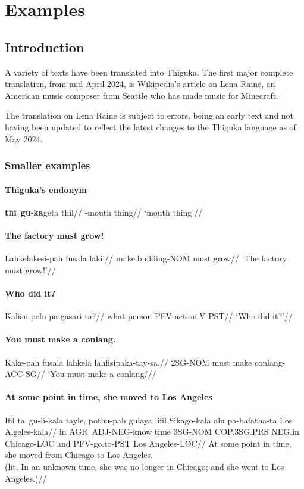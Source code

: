 
\part{Examples}
\chapter{Introduction}
A variety of texts have been translated into Thiguka. The first major complete translation, from mid-April 2024, is Wikipedia's article on Lena Raine, an American music composer from Seattle who has made music for Minecraft.

The translation on Lena Raine is subject to errors, being an early text and not having been updated to reflect the latest changes to the Thiguka language as of May 2024.

\section{Smaller examples}
\subsection{Thiguka's endonym}
\ex
\begingl
    \gla \textbf{thi}~\textbf{gu}-\textbf{ka}geta thil//
    \glb \agradj{}-mouth thing//
    \glft `mouth thing'//
\endgl
\xe

\subsection{The factory must grow!}
\ex
\begingl
    \gla Lahkelakesi-pah fusala laki!//
    \glb make.building-NOM must grow//
    \glft `The factory must grow!'//
\endgl
\xe

\subsection{Who did it?}
\ex
\begingl
    \gla Kalisu pelu pa-gasari-ta?//
    \glb what person PFV-action.V-PST//
    \glft `Who did it?'//
\endgl
\xe

\subsection{You must make a conlang.}
\ex
\begingl
    \gla Kake-pah fusala lahkela lahfisipaka-tay-sa.//
    \glb 2SG-NOM must make conlang-ACC-SG//
    \glft `You must make a conlang.'//
\endgl
\xe

\subsection{At some point in time, she moved to Los Angeles}
\ex
\begingl
    \gla Ifil ta~gu-li-kala    tayle, pothu-pah gulaya      lifil  Sikago-kala alu pa-bafatha-ta Los Algeles-kala//
    \glb in   AGR~ADJ-NEG-know time   3SG-NOM   COP.3SG.PRS NEG.in Chicago-LOC and PFV-go.to-PST Los Angeles-LOC//
    \glft At some point in time, she moved from Chicago to Los Angeles.\\
          (lit. In an unknown time, she was no longer in Chicago; and she went to Los Angeles.)//
\endgl
\xe


